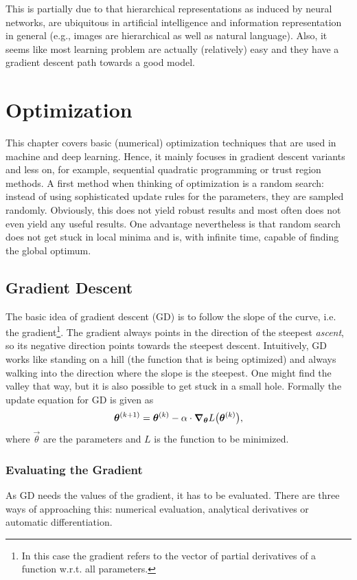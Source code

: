 		This is partially due to that hierarchical representations as induced by neural networks, are ubiquitous in artificial intelligence and information representation in general (e.g., images are hierarchical as well as natural language). Also, it seems like most learning problem are actually (relatively) easy and they have a gradient descent path towards a good model.

\chapter{Optimization}
	This chapter covers basic (numerical) optimization techniques that are used in machine and deep learning. Hence, it mainly focuses in gradient descent variants and less on, for example, sequential quadratic programming or trust region methods. A first method when thinking of optimization is a random search: instead of using sophisticated update rules for the parameters, they are sampled randomly. Obviously, this does not yield robust results and most often does not even yield any useful results. One advantage nevertheless is that random search does not get stuck in local minima and is, with infinite time, capable of finding the global optimum.

	\section{Gradient Descent}
		The basic idea of gradient descent (GD) is to follow the slope of the curve, i.e. the gradient\footnote{In this case the gradient refers to the vector of partial derivatives of a function w.r.t. all parameters.}. The gradient always points in the direction of the steepest \emph{ascent}, so its negative direction points towards the steepest descent. Intuitively, GD works like standing on a hill (the function that is being optimized) and always walking into the direction where the slope is the steepest. One might find the valley that way, but it is also possible to get stuck in a small hole. Formally the update equation for GD is given as
		\begin{equation}
			\bm{\theta}^{(k + 1)} = \bm{\theta}^{(k)} - \alpha \cdot \grad_{\bm{\theta}} L\big( \bm{\theta}^{(k)} \big),
		\end{equation}
		where \(\vec{\theta}\) are the parameters and \(L\) is the function to be minimized.

		\subsection{Evaluating the Gradient}
			As GD needs the values of the gradient, it has to be evaluated. There are three ways of approaching this: numerical evaluation, analytical derivatives or automatic differentiation.

